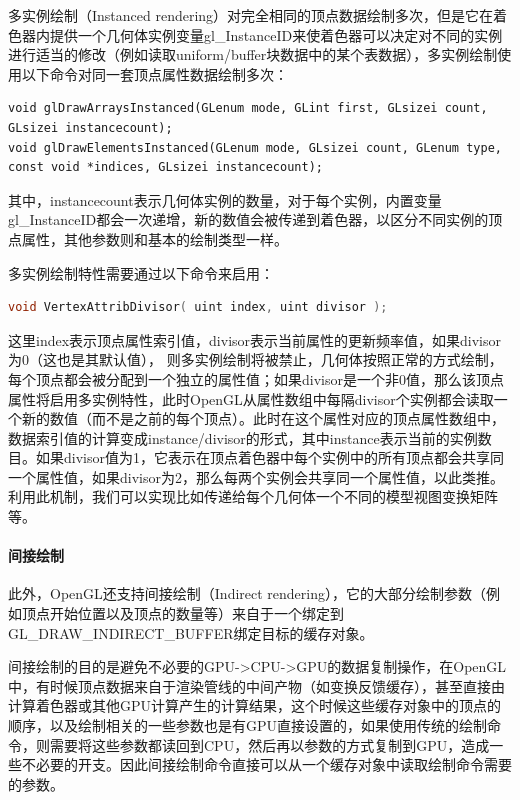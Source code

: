 多实例绘制（Instanced rendering）对完全相同的顶点数据绘制多次，但是它在着色器内提供一个几何体实例变量gl\_InstanceID来使着色器可以决定对不同的实例进行适当的修改（例如读取uniform/buffer块数据中的某个表数据），多实例绘制使用以下命令对同一套顶点属性数据绘制多次：

\begin{lstlisting}
void glDrawArraysInstanced​(GLenum mode​, GLint first​, GLsizei count​, GLsizei instancecount​);
void glDrawElementsInstanced​(GLenum mode​, GLsizei count​, GLenum type​, const void *indices​, GLsizei instancecount​);
\end{lstlisting}

其中，instancecount表示几何体实例的数量，对于每个实例，内置变量gl\_InstanceID都会一次递增，新的数值会被传递到着色器，以区分不同实例的顶点属性，其他参数则和基本的绘制类型一样。

多实例绘制特性需要通过以下命令来启用：

\begin{lstlisting}[language=C++]
void VertexAttribDivisor( uint index, uint divisor );
\end{lstlisting}

这里index表示顶点属性索引值，divisor表示当前属性的更新频率值，如果divisor为0（这也是其默认值）， 则多实例绘制将被禁止，几何体按照正常的方式绘制，每个顶点都会被分配到一个独立的属性值；如果divisor是一个非0值，那么该顶点属性将启用多实例特性，此时OpenGL从属性数组中每隔divisor个实例都会读取一个新的数值（而不是之前的每个顶点）。此时在这个属性对应的顶点属性数组中，数据索引值的计算变成instance/divisor的形式，其中instance表示当前的实例数目。如果divisor值为1，它表示在顶点着色器中每个实例中的所有顶点都会共享同一个属性值，如果divisor为2，那么每两个实例会共享同一个属性值，以此类推。利用此机制，我们可以实现比如传递给每个几何体一个不同的模型视图变换矩阵等。





\paragraph{间接绘制}
此外，OpenGL还支持间接绘制（Indirect rendering），它的大部分绘制参数（例如顶点开始位置以及顶点的数量等）来自于一个绑定到GL\_DRAW\_INDIRECT\_BUFFER绑定目标的缓存对象。

间接绘制的目的是避免不必要的GPU->CPU->GPU的数据复制操作，在OpenGL中，有时候顶点数据来自于渲染管线的中间产物（如变换反馈缓存），甚至直接由计算着色器或其他GPU计算产生的计算结果，这个时候这些缓存对象中的顶点的顺序，以及绘制相关的一些参数也是有GPU直接设置的，如果使用传统的绘制命令，则需要将这些参数都读回到CPU，然后再以参数的方式复制到GPU，造成一些不必要的开支。因此间接绘制命令直接可以从一个缓存对象中读取绘制命令需要的参数。

